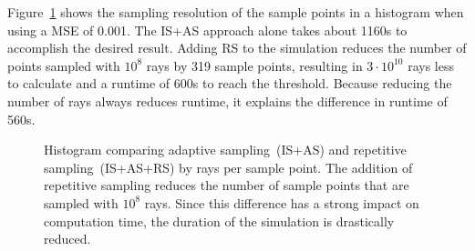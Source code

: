 Figure~\ref{plot:repetitive} shows the sampling resolution of the
sample points in a histogram when using a MSE of 0.001.  The IS+AS
approach alone takes about 1160s to accomplish the desired
result. Adding RS to the simulation reduces the number of points
sampled with $10^8$ rays by 319 sample points, resulting in
$3\cdot10^{10}$ rays less to calculate and a runtime of 600s to reach
the threshold. Because reducing the number of rays always reduces
runtime, it explains the difference in runtime of 560s.
\begin{figure}[H]
  \centerline{
    }
  \caption{Histogram comparing adaptive sampling~(IS+AS) and repetitive
    sampling~(IS+AS+RS) by rays per sample point.  The addition of
    repetitive sampling reduces the number of sample points that are
    sampled with $10^8$ rays. Since this difference has a strong
    impact on computation time, the duration of the simulation is
    drastically reduced.}
  \label{plot:repetitive}
\end{figure}

